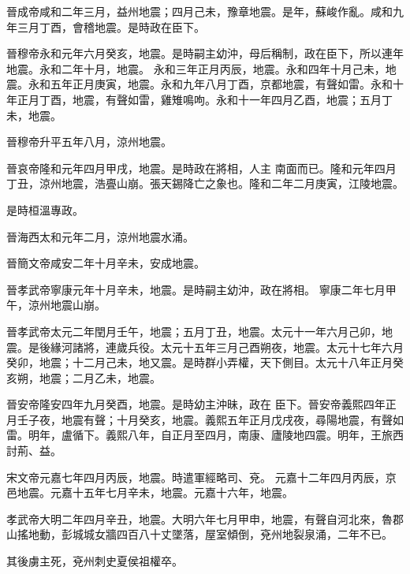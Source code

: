 \begin{pinyinscope}
 晉成帝咸和二年三月，益州地震；四月己未，豫章地震。是年，蘇峻作亂。咸和九年三月丁酉，會稽地震。是時政在臣下。



 晉穆帝永和元年六月癸亥，地震。是時嗣主幼沖，母后稱制，政在臣下，所以連年地震。永和二年十月，地震。
 永和三年正月丙辰，地震。永和四年十月己未，地震。永和五年正月庚寅，地震。永和九年八月丁酉，京都地震，有聲如雷。永和十年正月丁酉，地震，有聲如雷，雞雉鳴呴。永和十一年四月乙酉，地震；五月丁未，地震。



 晉穆帝升平五年八月，涼州地震。



 晉哀帝隆和元年四月甲戌，地震。是時政在將相，人主
 南面而已。隆和元年四月丁丑，涼州地震，浩亹山崩。張天錫降亡之象也。隆和二年二月庚寅，江陵地震。



 是時桓溫專政。



 晉海西太和元年二月，涼州地震水涌。



 晉簡文帝咸安二年十月辛未，安成地震。



 晉孝武帝寧康元年十月辛未，地震。是時嗣主幼沖，政在將相。
 寧康二年七月甲午，涼州地震山崩。



 晉孝武帝太元二年閏月壬午，地震；五月丁丑，地震。太元十一年六月己卯，地震。是後緣河諸將，連歲兵役。太元十五年三月己酉朔夜，地震。太元十七年六月癸卯，地震；十二月己未，地又震。是時群小弄權，天下側目。太元十八年正月癸亥朔，地震；二月乙未，地震。



 晉安帝隆安四年九月癸酉，地震。是時幼主沖昧，政在
 臣下。晉安帝義熙四年正月壬子夜，地震有聲；十月癸亥，地震。義熙五年正月戊戌夜，尋陽地震，有聲如雷。明年，盧循下。義熙八年，自正月至四月，南康、廬陵地四震。明年，王旅西討荊、益。



 宋文帝元嘉七年四月丙辰，地震。時遣軍經略司、兗。
 元嘉十二年四月丙辰，京邑地震。元嘉十五年七月辛未，地震。元嘉十六年，地震。



 孝武帝大明二年四月辛丑，地震。大明六年七月甲申，地震，有聲自河北來，魯郡山搖地動，彭城城女牆四百八十丈墜落，屋室傾倒，兗州地裂泉涌，二年不已。



 其後虜主死，兗州刺史夏侯祖權卒。




\end{pinyinscope}
